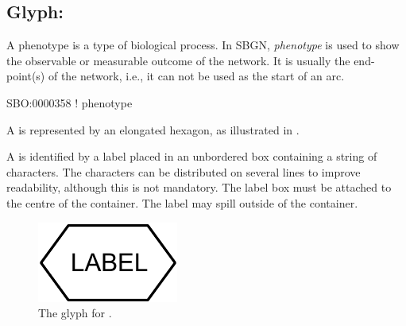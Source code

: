 \subsection{Glyph: }
\label{sec:af:phenotype}

A phenotype is a type of biological process.  In SBGN, \emph{phenotype} is used to show the observable or measurable outcome of the network.  It is usually the end-point(s) of the network, i.e., it can not be used as the start of an arc.

\begin{glyphDescription}

\glyphSboTerm
SBO:0000358 ! phenotype

\glyphContainer A  is represented by an elongated hexagon, as illustrated in .

\glyphLabel A  is identified by a label placed in an unbordered box containing a string of characters.  The characters can be distributed on several lines to improve readability, although this is not mandatory.  The label box must be attached to the centre of the  container.  The label may spill outside of the container.

\end{glyphDescription}

\begin{figure}[H]
  \centering
  \includegraphics[scale = 1]{images/build/phenotype.pdf}
  \caption{The \AF glyph for .}
  \label{fig:af:phenotype}
\end{figure}
